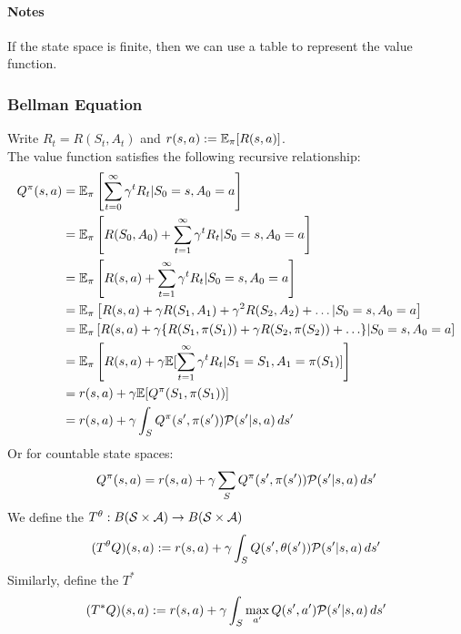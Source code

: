 \documentclass[11pt]{article}
\begin{document}
\paragraph{Notes}
If the state space is finite, then we can use a table to represent the value function.


\subsubsection{Bellman Equation}
Write $R_t = R(S_t, A_t)$ and $r(s,a) := \mathbb{E}_\pi[R(s,a)]$.\\
The value function satisfies the following recursive relationship:
\begin{align}
	Q^\pi(s, a) &= \mathbb{E}_\pi\left[ \sum_{t=0}^\infty \gamma^tR_t|S_0 = s, A_0 = a\right] \\
	&= \mathbb{E}_\pi\left[R(S_0, A_0) + \sum_{t=1}^\infty \gamma^tR_t|S_0 = s, A_0 = a\right] \\
	&= \mathbb{E}_\pi\left[R(s, a) + \sum_{t=1}^\infty \gamma^tR_t|S_0 = s, A_0 = a\right] \\
	&= \mathbb{E}_\pi\left[ R(s, a) + \gamma R(S_1, A_1) + \gamma^2R(S_2, A_2) + \hdots|S_0=s, A_0=a\right]\\
	&= \mathbb{E}_\pi\left[ R(s, a) + \gamma\{R(S_1, \pi(S_1)) + \gamma R(S_2, \pi(S_2)) + \hdots\}|S_0=s, A_0=a\right]\\
	&= \mathbb{E}_\pi\left[ R(s, a) + \gamma\mathbb{E}[\sum_{t=1}^\infty\gamma^tR_{t}|S_1=S_1, A_1=\pi(S_1)]\right]\\
	&= r(s,a) + \gamma  \mathbb{E}[Q^\pi(S_1, \pi(S_1))] \\
	&= r(s,a) + \gamma \int_S Q^\pi(s', \pi(s'))\mathcal{P}(s'|s,a)\,ds'
\end{align}
Or for countable state spaces:
$$Q^\pi(s, a) = r(s,a) + \gamma \sum_S Q^\pi(s', \pi(s'))\mathcal{P}(s'|s,a)\,ds'$$
We define the  $T^\theta: B(\mathcal{S} \times \mathcal{A}) \rightarrow B(\mathcal{S} \times \mathcal{A})$
$$(T^\theta Q)(s,a) := r(s,a) + \gamma \int_S Q(s', \theta(s'))\mathcal{P}(s'|s,a)\,ds'$$
Similarly, define the  $T^*$
$$(T^* Q)(s,a) := r(s,a) + \gamma \int_S\underset{a'}{\max}\,Q(s', a')\mathcal{P}(s'|s,a)\,ds'$$
\end{document}
